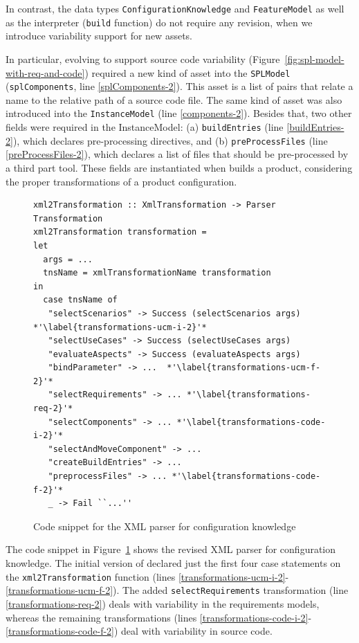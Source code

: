 In contrast, the data types \texttt{ConfigurationKnowledge} and
\texttt{FeatureModel} as well as the interpreter (\texttt{build}
function) do not require any revision, when we introduce variability
support for new assets. 

In particular, evolving \hp{} to support source code variability
(Figure~\ref{fig:spl-model-with-req-and-code}) required a new kind of
asset into the \texttt{SPLModel} (\texttt{splComponents}, line
\ref{splComponents-2}). This asset is a list of pairs that relate a
name to the relative path of a source code file. The same kind of
asset was also introduced into the \texttt{InstanceModel} (line
\ref{components-2}). Besides that, two other fields were required in
the InstanceModel: (a) \texttt{buildEntries} (line
\ref{buildEntries-2}), which declares pre-processing directives, and
(b) \texttt{preProcessFiles} (line \ref{preProcessFiles-2}), which
declares a list of files that should be pre-processed by a third part
tool. These fields are instantiated when \hp{} builds a product,
considering the proper transformations of a product configuration.


\begin{figure}
\begin{lstlisting}
xml2Transformation :: XmlTransformation -> Parser Transformation
xml2Transformation transformation =
let
  args = ...
  tnsName = xmlTransformationName transformation
in
  case tnsName of
   "selectScenarios" -> Success (selectScenarios args) *'\label{transformations-ucm-i-2}'*
   "selectUseCases" -> Success (selectUseCases args)
   "evaluateAspects" -> Success (evaluateAspects args)
   "bindParameter" -> ...  *'\label{transformations-ucm-f-2}'*
   "selectRequirements" -> ... *'\label{transformations-req-2}'*
   "selectComponents" -> ... *'\label{transformations-code-i-2}'*
   "selectAndMoveComponent" -> ...
   "createBuildEntries" -> ...
   "preprocessFiles" -> ... *'\label{transformations-code-f-2}'*
   _ -> Fail ``...''
\end{lstlisting}
\caption{Code snippet for the XML parser for configuration knowledge}
\label{fig:xml-transformation-parser}
\end{figure}


The code snippet in Figure~\ref{fig:xml-transformation-parser} shows
the revised XML parser for configuration knowledge. The initial
version of \hp{} declared just the first four case statements on the
\texttt{xml2Transformation} function (lines
\ref{transformations-ucm-i-2}-\ref{transformations-ucm-f-2}). The
added \texttt{selectRequirements} transformation (line
\ref{transformations-req-2}) deals with variability in the
requirements models, whereas the remaining transformations (lines
\ref{transformations-code-i-2}-\ref{transformations-code-f-2}) deal
with variability in source code. 

